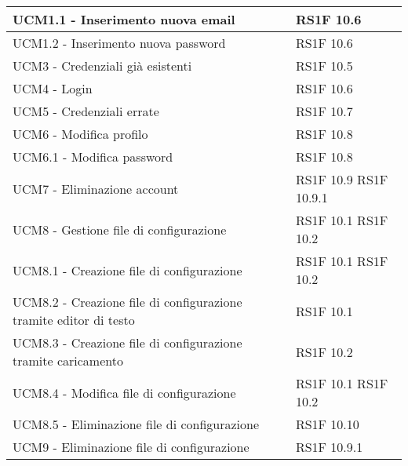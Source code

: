 \begin{center}
\begin{longtable}{ | p{5cm} | p{5cm} |}
            UCM1.1 - Inserimento nuova email &  RS1F 10.6 \newline  \\ \hline      
            UCM1.2 - Inserimento nuova password &  RS1F 10.6 \newline  \\ \hline      
            UCM3 - Credenziali già esistenti &  RS1F 10.5 \newline  \\ \hline      
            UCM4 - Login &  RS1F 10.6 \newline  \\ \hline      
            UCM5 - Credenziali errate &  RS1F 10.7 \newline  \\ \hline      
            UCM6 - Modifica profilo &  RS1F 10.8 \newline  \\ \hline      
            UCM6.1 - Modifica password &  RS1F 10.8 \newline  \\ \hline      
            UCM7 - Eliminazione account &  RS1F 10.9 \newline  RS1F 10.9.1 \newline  \\ \hline      
            UCM8 - Gestione file di configurazione &  RS1F 10.1 \newline  RS1F 10.2 \newline  \\ \hline      
            UCM8.1 - Creazione file di configurazione &  RS1F 10.1 \newline  RS1F 10.2 \newline  \\ \hline      
            UCM8.2 - Creazione file di configurazione tramite editor di testo &  RS1F 10.1 \newline  \\ \hline      
            UCM8.3 - Creazione file di configurazione tramite caricamento &  RS1F 10.2 \newline  \\ \hline      
            UCM8.4 - Modifica file di configurazione &  RS1F 10.1 \newline  RS1F 10.2 \newline  \\ \hline      
            UCM8.5 - Eliminazione file di configurazione &  RS1F 10.10 \newline  \\ \hline      
            UCM9 - Eliminazione file di configurazione &  RS1F 10.9.1 \newline  \\ \hline     
      \end{longtable}
      \egroup
      \end{center}  
\clearpage

